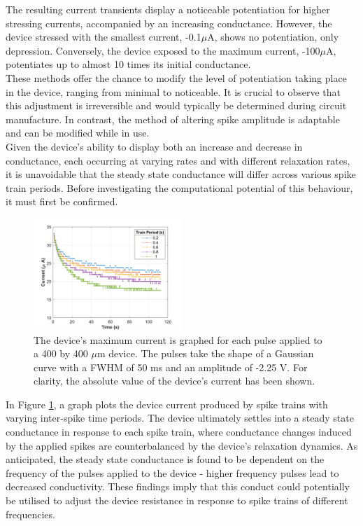 \noindent The resulting current transients display a noticeable potentiation for higher stressing currents, accompanied by an increasing conductance. However, the device stressed with the smallest current, -0.1$\mu$A, shows no potentiation, only depression. Conversely, the device exposed to the maximum current, -100$\mu$A, potentiates up to almost 10 times its initial conductance.\\

\noindent These methods offer the chance to modify the level of potentiation taking place in the device, ranging from minimal to noticeable. It is crucial to observe that this adjustment is irreversible and would typically be determined during circuit manufacture. In contrast, the method of altering spike amplitude is adaptable and can be modified while in use.\\

\noindent Given the device's ability to display both an increase and decrease in conductance, each occurring at varying rates and with different relaxation rates, it is unavoidable that the steady state conductance will differ across various spike train periods. Before investigating the computational potential of this behaviour, it must first be confirmed.\\

\begin{figure}[htbp!] 
\centering    
\includegraphics[width=0.5\textwidth]{Chapter3/Figs/3k.png}
\caption[Device suitable for trains of voltage spikes with varying inter-spike time periods.]{The device's maximum current is graphed for each pulse applied to a 400 by 400 $\mu$m device. The pulses take the shape of a Gaussian curve with a FWHM of 50 ms and an amplitude of -2.25 V. For clarity, the absolute value of the device's current has been shown.}
\label{fig:3k}
\end{figure}


\noindent In Figure \ref{fig:3k}, a graph plots the device current produced by spike trains with varying inter-spike time periods. The device ultimately settles into a steady state conductance in response to each spike train, where conductance changes induced by the applied spikes are counterbalanced by the device's relaxation dynamics. As anticipated, the steady state conductance is found to be dependent on the frequency of the pulses applied to the device - higher frequency pulses lead to decreased conductivity. These findings imply that this conduct could potentially be utilised to adjust the device resistance in response to spike trains of different frequencies. 


